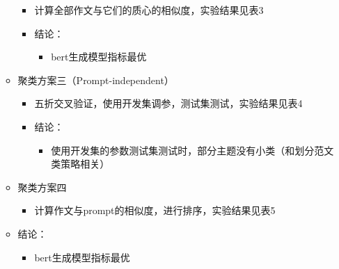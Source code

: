 \documentclass[11pt]{article}
\begin{document}
\begin{CJK}{UTF8}{gkai}
\begin{itemize}
\begin{itemize}
\begin{itemize}
      \item 计算全部作文与它们的质心的相似度，实验结果见表3
      \item 结论：
      \begin{itemize}
        \item bert生成模型指标最优
      \end{itemize}
    \end{itemize}
    \item 聚类方案三（Prompt-independent）
    \begin{itemize}
      \item 五折交叉验证，使用开发集调参，测试集测试，实验结果见表4
      \item 结论：
      \begin{itemize}
        \item 使用开发集的参数测试集测试时，部分主题没有小类（和划分范文类策略相关）
      \end{itemize}
    \end{itemize}
    \item 聚类方案四
    \begin{itemize}
      \item 计算作文与prompt的相似度，进行排序，实验结果见表5
    \end{itemize}
    \item 结论：
    \begin{itemize}
      \item bert生成模型指标最优
    \end{itemize}
  \end{itemize}
\end{itemize}


\end{CJK}
\end{document}
